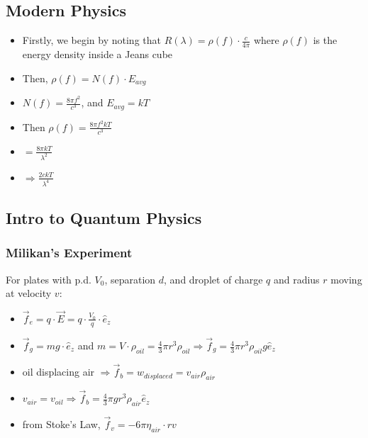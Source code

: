 \documentclass{article}
\begin{document}
\subsection{Modern Physics}


\begin{itemize}
    \item Firstly, we begin by noting that \(R(\lambda)=\rho(f)\cdot\frac{c}{4\pi}\) where \(\rho(f)\) is the energy density inside a Jeans cube
    \item Then, \(\rho(f)=N(f)\cdot E_{avg}\) 
    \item \(N(f)=\frac{8\pi f^2}{c^3}\), and \(E_{avg} = kT\)
    \item Then \(\rho(f)=\frac{8\pi f^2kT}{c^3}\)
    \item \(=\frac{8\pi kT}{\lambda^2}\)
    \item \(\Rightarrow\boxed{\frac{2ckT}{\lambda^4}}\)
\end{itemize}


\subsection{Intro to Quantum Physics}

\subsubsection*{Milikan's Experiment}
For plates with p.d. \(V_0\), separation \(d\),
and droplet of charge \(q\) and radius \(r\) moving at velocity \(v\):

\begin{itemize}
    \item \(\vec f_e = q\cdot\vec E = q\cdot\frac{V_0}{q}\cdot\hat e_z\)
    \item \(\vec f_g = mg\cdot\hat e_z\) and \(m=V\cdot \rho_{oil}=\frac{4}{3}\pi r^3\rho_{oil}\Rightarrow \vec f_g = \frac{4}{3}\pi r^3\rho_{oil} g\hat e_z \)
    \item oil displacing air \(\Rightarrow\vec f_b = w_{displaced}=v_{air}\rho_{air}\)
    \item \(v_{air} = v_{oil}\Rightarrow\vec f_b = \frac{4}{3}\pi g r^3\rho_{air}\hat e_z\)
    \item from Stoke's Law, \(\vec f_v = -6\pi\eta_{air}\cdot rv\)
\end{itemize}
\end{document}
